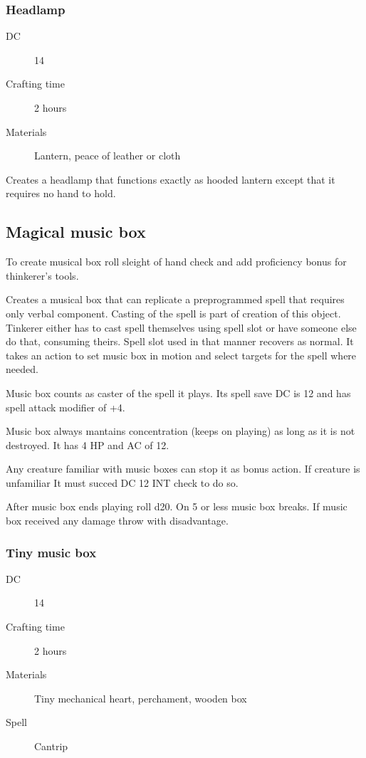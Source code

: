 \subsubsection{Headlamp}

\begin{description}
\item [DC] 14 \sleightofhands
\item [Crafting time] 2 hours
\item [Materials] Lantern, peace of leather or cloth
\end{description}

Creates a headlamp that functions exactly as hooded lantern except that it requires no hand to hold.

\subsection{Magical music box}

To create musical box roll sleight of hand check and add proficiency bonus for thinkerer's tools.

Creates a musical box that can replicate a preprogrammed spell that requires only verbal component. Casting of the spell is part of
creation of this object. Tinkerer either has to cast spell themselves using spell slot or have someone else do that, consuming theirs. Spell slot used in that manner recovers as normal. It takes an action to set music box in motion and select targets for the spell where needed.

Music box counts as caster of the spell it plays. Its spell save DC is 12 and has spell attack modifier of +4.

Music box always mantains concentration (keeps on playing) as long as it is not destroyed. It has 4 HP and AC of 12.

Any creature familiar with music boxes can stop it as bonus action. If creature is unfamiliar It must succed DC 12 INT check to do so.

After music box ends playing roll d20. On 5 or less music box breaks. If music box received any damage throw with disadvantage.

\subsubsection{Tiny music box}

\begin{description}
\item [DC] 14 \arcana
\item [Crafting time] 2 hours
\item [Materials] Tiny mechanical heart, perchament, wooden box
\item [Spell] Cantrip
\end{description}

